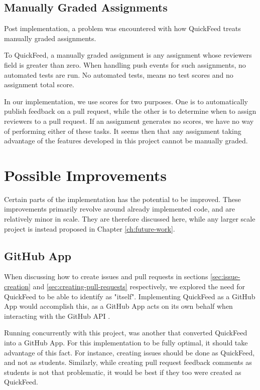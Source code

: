 \subsection{Manually Graded Assignments}

Post implementation, a problem was encountered with how QuickFeed treats manually graded assignments.

To QuickFeed, a manually graded assignment is any assignment whose reviewers field is greater than zero.
When handling push events for such assignments, no automated tests are run.
No automated tests, means no test scores and no assignment total score.

In our implementation, we use scores for two purposes.
One is to automatically publish feedback on a pull request, while the other is to determine when to assign reviewers to a pull request.
If an assignment generates no scores, we have no way of performing either of these tasks.
It seems then that any assignment taking advantage of the features developed in this project cannot be manually graded.

\section{Possible Improvements}

Certain parts of the implementation has the potential to be improved.
These improvements primarily revolve around already implemented code, and are relatively minor in scale.
They are therefore discussed here, while any larger scale project is instead proposed in Chapter \ref{ch:future-work}.

\subsection{GitHub App}
\label{section:github-app}

When discussing how to create issues and pull requests in sections \ref{sec:issue-creation} and \ref{sec:creating-pull-requests} respectively, we explored the need for QuickFeed to be able to identify as "itself".
Implementing QuickFeed as a GitHub App would accomplish this, as a GitHub App acts on its own behalf when interacting with the GitHub API \cite{apps}.

Running concurrently with this project, was another that converted QuickFeed into a GitHub App.
For this implementation to be fully optimal, it should take advantage of this fact.
For instance, creating issues should be done as QuickFeed, and not as students.
Similarly, while creating pull request feedback comments as students is not that problematic, it would be best if they too were created as QuickFeed.

